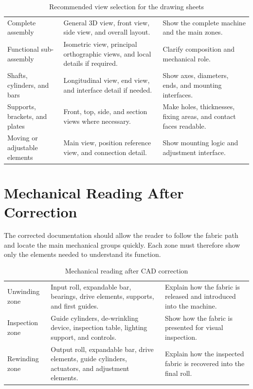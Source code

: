 \begin{table}[H]
\centering
\small
\caption{Recommended view selection for the drawing sheets}
\label{tab:chapter2-7}
\begin{tabularx}{\textwidth}{|P{0.25\textwidth}|P{0.34\textwidth}|Y|}
\hline
{}
 &  &  \\
\hline
Complete assembly & General 3D view, front view, side view, and overall layout. & Show the complete machine and the main zones. \\
\hline
Functional sub-assembly & Isometric view, principal orthographic views, and local details if required. & Clarify composition and mechanical role. \\
\hline
Shafts, cylinders, and bars & Longitudinal view, end view, and interface detail if needed. & Show axes, diameters, ends, and mounting interfaces. \\
\hline
Supports, brackets, and plates & Front, top, side, and section views where necessary. & Make holes, thicknesses, fixing areas, and contact faces readable. \\
\hline
Moving or adjustable elements & Main view, position reference view, and connection detail. & Show mounting logic and adjustment interface. \\
\hline
\end{tabularx}
\end{table}

\section{Mechanical Reading After Correction}

The corrected documentation should allow the reader to follow the fabric path and locate the main mechanical groups quickly. Each zone must therefore show only the elements needed to understand its function.

\begin{table}[H]
\centering
\small
\caption{Mechanical reading after CAD correction}
\label{tab:chapter2-8}
\begin{tabularx}{\textwidth}{|P{0.25\textwidth}|P{0.34\textwidth}|Y|}
\hline
{}
 &  &  \\
\hline
Unwinding zone & Input roll, expandable bar, bearings, drive elements, supports, and first guides. & Explain how the fabric is released and introduced into the machine. \\
\hline
Inspection zone & Guide cylinders, de-wrinkling device, inspection table, lighting support, and controls. & Show how the fabric is presented for visual inspection. \\
\hline
Rewinding zone & Output roll, expandable bar, drive elements, guide cylinders, actuators, and adjustment elements. & Explain how the inspected fabric is recovered into the final roll. \\
\hline
\end{tabularx}
\end{table}

